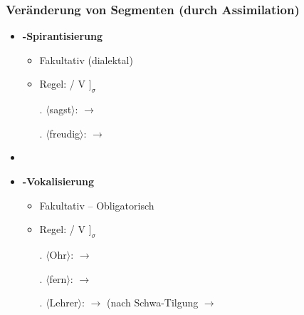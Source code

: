 \begin{frame}
\frametitle{Veränderung von Segmenten (durch Assimilation)}

\begin{itemize}
	\item \textbf{-Spirantisierung}

	\begin{itemize}
		\item Fakultativ (dialektal)
		\item Regel:  \ras {} / V\underline{\quad} $]_\sigma$

	\ex. $\langle$sagst$\rangle$:  $\rightarrow$ \textipa{[za:xst]}
	
	\ex. $\langle$freudig$\rangle$:  $\rightarrow$ \textipa{[f\;R\t{OI}.dI\c{c}]}

	\end{itemize}

	\item[]
	\item \textbf{-Vokalisierung}
	
	\begin{itemize}
		\item Fakultativ -- Obligatorisch
		\item Regel:  \ras \textipa{[5]} / V\underline{\quad} $]_\sigma$

		\ex. $\langle$Ohr$\rangle$:  $\rightarrow$ \textipa{[Po:5]}

		\ex. $\langle$fern$\rangle$:  $\rightarrow$ \textipa{[fE5n]}

		\ex. $\langle$Lehrer$\rangle$:  $\rightarrow$ \textipa{[le:.\;R@5]} (nach Schwa-Tilgung $\rightarrow$ \textipa{[le:.\;R5]}

	\end{itemize}

\end{itemize}

\end{frame}




